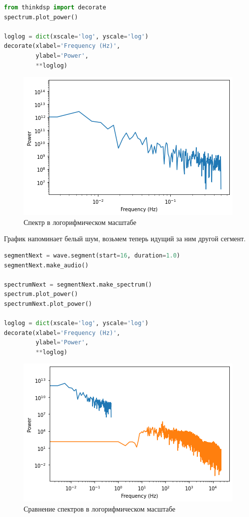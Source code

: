 \begin{lstlisting}[language=Python]
from thinkdsp import decorate
spectrum.plot_power()

loglog = dict(xscale='log', yscale='log')
decorate(xlabel='Frequency (Hz)',
         ylabel='Power', 
         **loglog)
\end{lstlisting}
\begin{figure}[H]
	\begin{center}
		\includegraphics[scale=1]{fig/lab04/lab04_2.png}
		\caption{Спектр в логорифмическом масштабе}
	\end{center}
\end{figure}

График напоминает белый шум, возьмем теперь идущий за ним другой сегмент.

\begin{lstlisting}[language=Python]
segmentNext = wave.segment(start=16, duration=1.0)
segmentNext.make_audio()

spectrumNext = segmentNext.make_spectrum()
spectrum.plot_power()
spectrumNext.plot_power()

loglog = dict(xscale='log', yscale='log')
decorate(xlabel='Frequency (Hz)',
         ylabel='Power', 
         **loglog)
\end{lstlisting}
\begin{figure}[H]
	\begin{center}
		\includegraphics[scale=1]{fig/lab04/lab04_3.png}
		\caption{Сравнение спектров в логорифмическом масштабе}
	\end{center}
\end{figure}


